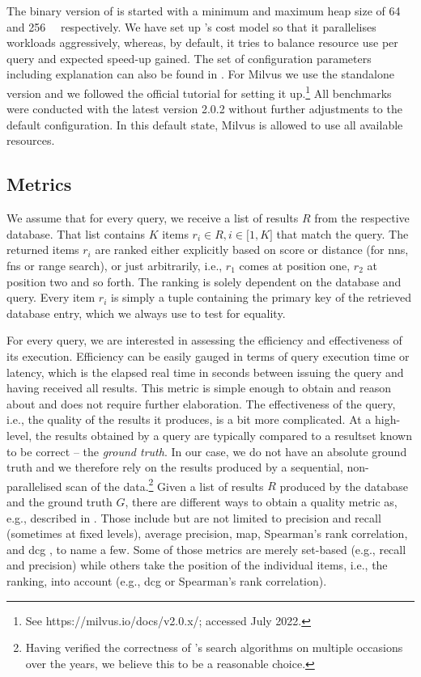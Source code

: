 The binary version of \cottontail{} is started with a minimum and maximum heap size of \SI{64}{\giga\byte} and \SI{256}{\giga\byte} respectively. We have set up \cottontail{}'s cost model so that it parallelises workloads aggressively, whereas, by default, it tries to balance resource use per query and expected speed-up gained. The set of configuration parameters including explanation can also be found in . For Milvus we use the standalone version and we followed the official tutorial for setting it up.\footnote{See https://milvus.io/docs/v2.0.x/; accessed July 2022.} All benchmarks were conducted with the latest version 2.0.2 without further adjustments to the default configuration. In this default state, Milvus is allowed to use all available resources.

\subsection{Metrics}

We assume that for every query, we receive a list of results $R$ from the respective database. That list contains $K$ items $r_i \in R, i \in \lbrack 1, K  \rbrack $ that match the query. The returned items $r_i$ are ranked either explicitly based on score or distance (for \acrshort{nns}, \acrshort{fns} or range search), or just arbitrarily, i.e., $r_1$ comes at position one, $r_2$ at position two and so forth. The ranking is solely dependent on the database and query. Every item $r_i$ is simply a tuple containing the primary key of the retrieved database entry, which we always use to test for equality.

For every query, we are interested in assessing the efficiency and effectiveness of its execution. Efficiency can be easily gauged in terms of query execution time or latency, which is the elapsed real time in seconds between issuing the query and having received all results. This metric is simple enough to obtain and reason about and does not require further elaboration. The effectiveness of the query, i.e., the quality of the results it produces, is a bit more complicated. At a high-level, the results obtained by a query are typically compared to a resultset known to be correct -- the \emph{ground truth}. In our case, we do not have an absolute ground truth and we therefore rely on the results produced by a sequential, non-parallelised scan of the data.\footnote{Having verified the correctness of \cottontail{}'s search algorithms on multiple occasions over the years, we believe this to be a reasonable choice.} Given a list of results $R$ produced by the database and the ground truth $G$, there are different ways to obtain a quality metric as, e.g., described in \cite{Webber:2010Similarity}. Those include but are not limited to precision and recall (sometimes at fixed levels), average precision, \acrfull{map}, Spearman's rank correlation, and \acrfull{dcg} \cite{Jarvelin:2002Cumulated}, to name a few. Some of those metrics are merely set-based (e.g., recall and precision) while others take the position of the individual items, i.e., the ranking, into account (e.g., \acrshort{dcg} or Spearman's rank correlation).


